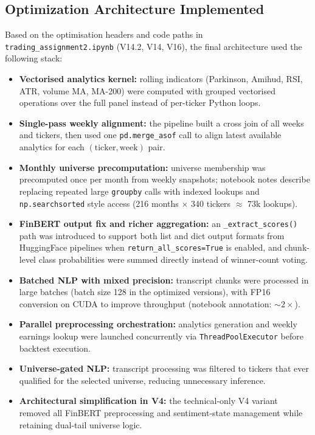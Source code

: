 \documentclass[11pt,twoside,a4paper]{article}
\begin{document}
\subsection*{Optimization Architecture Implemented}
Based on the optimisation headers and code paths in \verb|trading_assignment2.ipynb| (V14.2, V14, V16), the final architecture used the following stack:
\begin{itemize}
    \item \textbf{Vectorised analytics kernel:} rolling indicators (Parkinson, Amihud, RSI, ATR, volume MA, MA-200) were computed with grouped vectorised operations over the full panel instead of per-ticker Python loops.
    \item \textbf{Single-pass weekly alignment:} the pipeline built a cross join of all weeks and tickers, then used one \verb|pd.merge_asof| call to align latest available analytics for each \((\text{ticker}, \text{week})\) pair.
    \item \textbf{Monthly universe precomputation:} universe membership was precomputed once per month from weekly snapshots; notebook notes describe replacing repeated large \verb|groupby| calls with indexed lookups and \verb|np.searchsorted| style access (216 months \(\times\) 340 tickers \(\approx\) 73k lookups).
    \item \textbf{FinBERT output fix and richer aggregation:} an \verb|_extract_scores()| path was introduced to support both list and dict output formats from HuggingFace pipelines when \verb|return_all_scores=True| is enabled, and chunk-level class probabilities were summed directly instead of winner-count voting.
    \item \textbf{Batched NLP with mixed precision:} transcript chunks were processed in large batches (batch size 128 in the optimized versions), with FP16 conversion on CUDA to improve throughput (notebook annotation: \(\sim2\times\)).
    \item \textbf{Parallel preprocessing orchestration:} analytics generation and weekly earnings lookup were launched concurrently via \verb|ThreadPoolExecutor| before backtest execution.
    \item \textbf{Universe-gated NLP:} transcript processing was filtered to tickers that ever qualified for the selected universe, reducing unnecessary inference.
    \item \textbf{Architectural simplification in V4:} the technical-only V4 variant removed all FinBERT preprocessing and sentiment-state management while retaining dual-tail universe logic.
\end{itemize}
\end{document}
